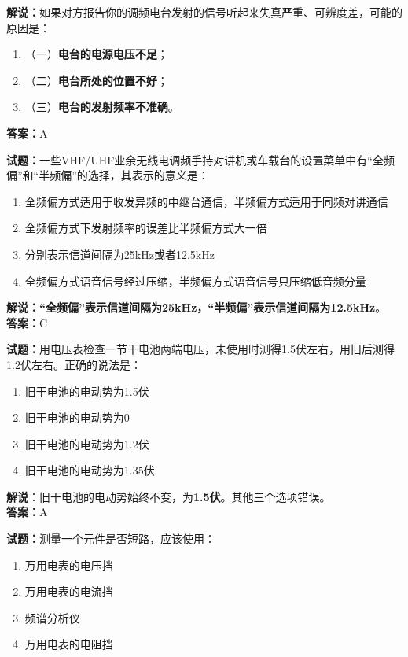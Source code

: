 \documentclass{ctexbook}
\begin{document}
\noindent\textbf{解说：}如果对方报告你的调频电台发射的信号听起来失真严重、可辨度差，可能的原因是：
\begin{enumerate}[label=, leftmargin=0.8em]
  \item （一）\textbf{电台的电源电压不足}；
  \item （二）\textbf{电台所处的位置不好}；
  \item （三）\textbf{电台的发射频率不准确}。
\end{enumerate}
\noindent\textbf{答案：}A

\bigskip

\noindent\textbf{试题：}一些VHF/UHF业余无线电调频手持对讲机或车载台的设置菜单中有“全频偏”和“半频偏”的选择，其表示的意义是：

\begin{enumerate}[leftmargin=3em]
  \item 全频偏方式适用于收发异频的中继台通信，半频偏方式适用于同频对讲通信
  \item 全频偏方式下发射频率的误差比半频偏方式大一倍
  \item 分别表示信道间隔为25\si{\kHz}或者12.5\si{\kHz}
  \item 全频偏方式语音信号经过压缩，半频偏方式语音信号只压缩低音频分量
\end{enumerate}

\noindent\textbf{解说：}\textbf{“全频偏”表示信道间隔为25\si{\kHz}，“半频偏”表示信道间隔为12.5\si{\kHz}}。\\\noindent\textbf{答案：}C

\bigskip

\noindent\textbf{试题：}用电压表检查一节干电池两端电压，未使用时测得1.5伏左右，用旧后测得1.2伏左右。正确的说法是：

\begin{enumerate}[leftmargin=3em]
  \item 旧干电池的电动势为1.5伏
  \item 旧干电池的电动势为0
  \item 旧干电池的电动势为1.2伏
  \item 旧干电池的电动势为1.35伏
\end{enumerate}

\noindent\textbf{解说}：旧干电池的电动势始终不变，为\textbf{1.5伏}。其他三个选项错误。\\\noindent\textbf{答案：}A

\bigskip

\noindent\textbf{试题：}测量一个元件是否短路，应该使用：

\begin{enumerate}[leftmargin=3em]
  \item 万用电表的电压挡
  \item 万用电表的电流挡
  \item 频谱分析仪
  \item 万用电表的电阻挡
\end{enumerate}
\end{document}
